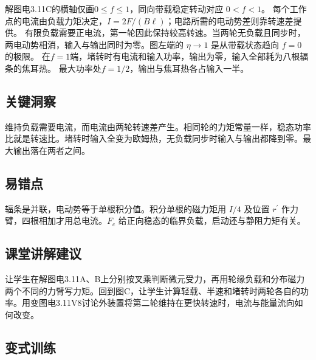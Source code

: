\documentclass[UTF8,fontset=fandol,a4paper,11pt]{ctexart}
\begin{document}
解图电3.11C的横轴仅画$0\le f\le1$，同向带载稳定转动对应 $0<f<1$。
每个工作点的电流由负载力矩决定，$I=2F/(B\ell)$；电路所需的电动势差则靠转速差提供。
有限负载需要正电流，第一轮因此保持较高转速。当两轮无负载且同步时，两电动势相消，输入与输出同时为零。图左端的 $\eta\to1$ 是从带载状态趋向 $f=0$ 的极限。
在$f=1$端，堵转时有电流和输入功率，输出为零，输入全部耗为八根辐条的焦耳热。
最大功率处$f=1/2$，输出与焦耳热各占输入一半。




\subsection*{关键洞察}

维持负载需要电流，而电流由两轮转速差产生。相同轮的力矩常量一样，稳态功率比就是转速比。堵转时输入全变为欧姆热，无负载同步时输入与输出都降到零。最大输出落在两者之间。



\subsection*{易错点}

辐条是并联，电动势等于单根积分值。积分单根的磁力矩用 $I/4$ 及位置 $r^\prime$ 作力臂，四根相加才用总电流。$F_c$ 给正向稳态的临界负载，启动还与静阻力矩有关。



\subsection*{课堂讲解建议}

让学生在解图电3.11A、B上分别按叉乘判断微元受力，再用轮缘负载和分布磁力两个不同的力臂写力矩。回到图C，让学生计算轻载、半速和堵转时两轮各自的功率。用变图电3.11V8讨论外装置将第二轮维持在更快转速时，电流与能量流向如何改变。


\subsection*{变式训练}
\end{document}
